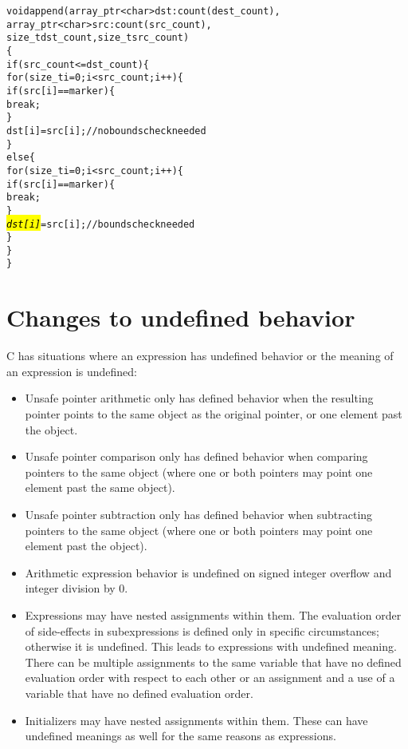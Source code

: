 \begin{alltt}
void append(array\_ptr<char> dst: count(dest\_count), 
            array\_ptr<char> src : count(src\_count), 
            size\_t dst\_count, size_t src\_count)
\{ 
    if (src\_count <= dst\_count) \{
        for (size\_t i = 0; i < src\_count; i++) \{
            if (src[i] == marker) \{
                break;
            \}
            dst[i] = src[i];  // no bounds check needed
        \}   
    else \{
        for (size\_t i = 0; i < src\_count; i++) \{
            if (src[i] == marker) \{
                break;
            \}
            \hl{\textit{dst[i]}} = src[i];  // bounds check needed
        \}   
    \}
\}
\end{alltt}

\section{Changes to undefined behavior}
\label{section:changes-to-undefined-behavior}

C has situations where an expression has undefined behavior or the
meaning of an expression is undefined:

\begin{itemize}
\item
  Unsafe pointer arithmetic only has defined behavior when the resulting
  pointer points to the same object as the original pointer, or one
  element past the object.
\item
  Unsafe pointer comparison only has defined behavior when comparing
  pointers to the same object (where one or both pointers may point one
  element past the same object).
\item
  Unsafe pointer subtraction only has defined behavior when subtracting
  pointers to the same object (where one or both pointers may point one
  element past the object).
\item
  Arithmetic expression behavior is undefined on signed integer overflow
  and integer division by 0.
\item
  Expressions may have nested assignments within them. The evaluation
  order of side-effects in subexpressions is defined only in specific
  circumstances; otherwise it is undefined. This leads to expressions
  with undefined meaning. There can be multiple assignments to the same
  variable that have no defined evaluation order with respect to each
  other or an assignment and a use of a variable that have no defined
  evaluation order.
\item
  Initializers may have nested assignments within them. These can have
  undefined meanings as well for the same reasons as expressions.
\end{itemize}

